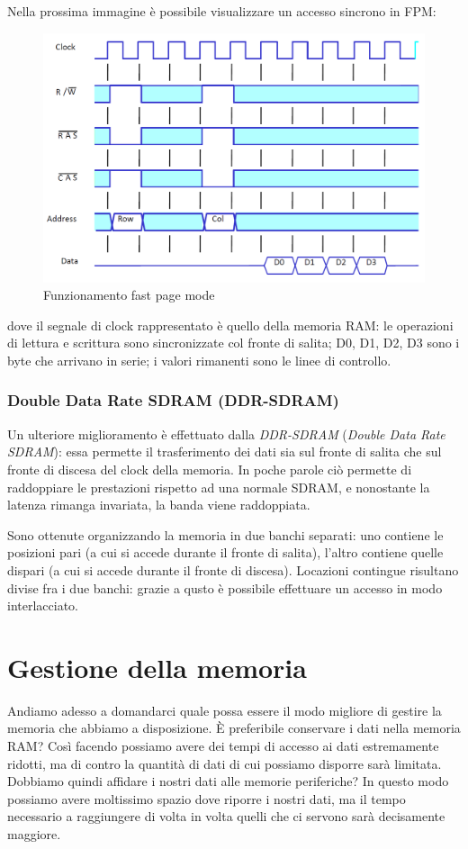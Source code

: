 \documentclass[class=book, crop=false, oneside]{standalone}
\begin{document}
Nella prossima immagine è possibile visualizzare un accesso sincrono in FPM:
\begin{figure}[H]
	\centering
	\includegraphics[width=\textwidth,keepaspectratio]{FPM.png}
	\caption{Funzionamento fast page mode}
\end{figure}
dove il segnale di clock rappresentato è quello della memoria RAM: le operazioni di lettura e scrittura sono sincronizzate col fronte di salita; D0, D1, D2, D3 sono i byte che arrivano in serie; i valori rimanenti sono le linee di controllo.

\subsubsection{Double Data Rate SDRAM (DDR-SDRAM)}
Un ulteriore miglioramento è effettuato dalla \emph{DDR-SDRAM} (\emph{Double Data Rate SDRAM}): essa permette il trasferimento dei dati sia sul fronte di salita che sul fronte di discesa del clock della memoria. In poche parole ciò permette di raddoppiare le prestazioni rispetto ad una normale SDRAM, e nonostante la latenza rimanga invariata, la banda viene raddoppiata.

Sono ottenute organizzando la memoria in due banchi separati: uno contiene le posizioni pari (a cui si accede durante il fronte di salita), l'altro contiene quelle dispari (a cui si accede durante il fronte di discesa). Locazioni contingue risultano divise fra i due banchi: grazie a qusto è possibile effettuare un accesso in modo interlacciato.

\section{Gestione della memoria}
Andiamo adesso a domandarci quale possa essere il modo migliore di gestire la memoria che abbiamo a disposizione. È preferibile conservare i dati nella memoria RAM? Così facendo possiamo avere dei tempi di accesso ai dati estremamente ridotti, ma di contro la quantità di dati di cui possiamo disporre sarà limitata. Dobbiamo quindi affidare i nostri dati alle memorie periferiche? In questo modo possiamo avere moltissimo spazio dove riporre i nostri dati, ma il tempo necessario a raggiungere di volta in volta quelli che ci servono sarà decisamente maggiore.
\end{document}
